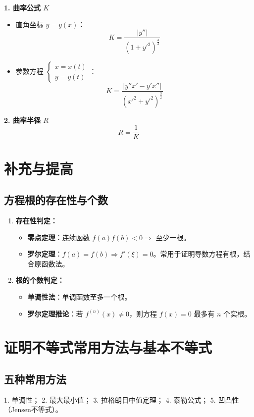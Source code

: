 \documentclass[a4paper,12pt]{ctexart}
\newenvironment{purplebox}
  {\begin{tcolorbox}[colback=white, colframe=boxpurple, boxrule=1pt, sharp corners, title=\textbf{定理/定义}]}
  {\end{tcolorbox}}
\begin{document}
\begin{purplebox}
    \textbf{1. 曲率公式 $K$}
    \begin{itemize}
        \item 直角坐标 $y=y(x)$：
        \[ K = \frac{|y''|}{(1+y'^2)^{\frac{3}{2}}} \]
        \item 参数方程 $\begin{cases} x = x(t) \\ y = y(t) \end{cases}$：
        \[ K = \frac{|y''x' - y'x''|}{(x'^2+y'^2)^{\frac{3}{2}}} \]
    \end{itemize}
    \textbf{2. 曲率半径 $R$}
    \[ R = \frac{1}{K} \]
\end{purplebox}

\section{补充与提高}

\subsection{方程根的存在性与个数}
\begin{enumerate}
    \item \textbf{存在性判定：}
    \begin{itemize}
        \item \textbf{零点定理}：连续函数 $f(a)f(b) < 0 \Rightarrow$ 至少一根。
        \item \textbf{罗尔定理}：$f(a)=f(b) \Rightarrow f'(\xi)=0$。常用于证明导数方程有根，结合原函数法。
    \end{itemize}
    \item \textbf{根的个数判定：}
    \begin{itemize}
        \item \textbf{单调性法}：单调函数至多一个根。
        \item \textbf{罗尔定理推论}：若 $f^{(n)}(x) \neq 0$，则方程 $f(x)=0$ 最多有 $n$ 个实根。
    \end{itemize}
\end{enumerate}

\section{证明不等式常用方法与基本不等式}

\subsection{五种常用方法}
1. 单调性； 2. 最大最小值； 3. 拉格朗日中值定理； 4. 泰勒公式； 5. 凹凸性（Jensen不等式）。
\end{document}
